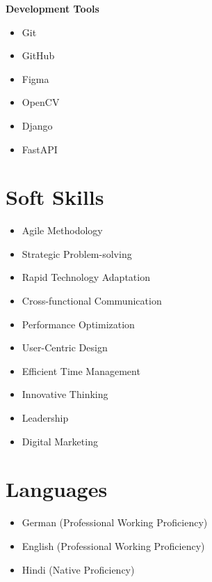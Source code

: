 \documentclass[a4paper,10pt]{article}
\begin{document}
\begin{multicols}{2}
\vspace{0.3em}
\textbf{Development Tools}
\vspace{-0.2em}
\begin{itemize}[leftmargin=1em,itemsep=0.3em,parsep=0pt,label=$\bullet$]
    \item Git
    \item GitHub
    \item Figma
    \item OpenCV
    \item Django
    \item FastAPI
\end{itemize}

\section*{Soft Skills}
\vspace{-0.2em}
\begin{itemize}[leftmargin=1em,itemsep=0.2em,parsep=0pt,label=$\cdot$]
    \item Agile Methodology
    \item Strategic Problem-solving
    \item Rapid Technology Adaptation
    \item Cross-functional Communication
    \item Performance Optimization
    \item User-Centric Design
    \item Efficient Time Management
    \item Innovative Thinking
    \item Leadership
    \item Digital Marketing
\end{itemize}

\section*{Languages}
\vspace{-0.2em}
\begin{itemize}[leftmargin=1em,itemsep=0.2em,parsep=0pt]
    \item German (Professional Working Proficiency)
    \item English (Professional Working Proficiency)
    \item Hindi (Native Proficiency)
\end{itemize}

\columnbreak

\end{multicols}
\end{document}
